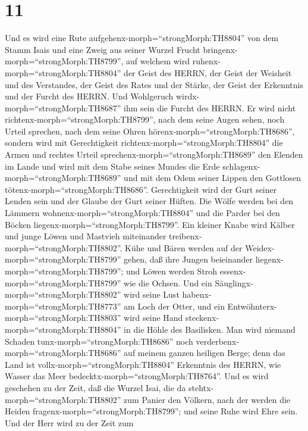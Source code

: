 \hypertarget{section-10}{%
\section{11}\label{section-10}}

 Und es wird eine Rute
aufgehenx-morph=``strongMorph:TH8804'' von dem Stamm Isais und eine
Zweig aus seiner Wurzel Frucht bringenx-morph=``strongMorph:TH8799'',
 auf welchem wird ruhenx-morph=``strongMorph:TH8804'' der
Geist des HERRN, der Geist der Weisheit und des Verstandes, der Geist
des Rates und der Stärke, der Geist der Erkenntnis und der Furcht des
HERRN.  Und Wohlgeruch wirdx-morph=``strongMorph:TH8687''
ihm sein die Furcht des HERRN. Er wird nicht
richtenx-morph=``strongMorph:TH8799'', nach dem seine Augen sehen, noch
Urteil sprechen, nach dem seine Ohren
hörenx-morph=``strongMorph:TH8686'',  sondern wird mit
Gerechtigkeit richtenx-morph=``strongMorph:TH8804'' die Armen und
rechtes Urteil sprechenx-morph=``strongMorph:TH8689'' den Elenden im
Lande und wird mit dem Stabe seines Mundes die Erde
schlagenx-morph=``strongMorph:TH8689'' und mit dem Odem seiner Lippen
den Gottlosen tötenx-morph=``strongMorph:TH8686''. 
Gerechtigkeit wird der Gurt seiner Lenden sein und der Glaube der Gurt
seiner Hüften.  Die Wölfe werden bei den Lämmern
wohnenx-morph=``strongMorph:TH8804'' und die Parder bei den Böcken
liegenx-morph=``strongMorph:TH8799''. Ein kleiner Knabe wird Kälber und
junge Löwen und Mastvieh miteinander
treibenx-morph=``strongMorph:TH8802''.  Kühe und Bären
werden auf der Weidex-morph=``strongMorph:TH8799'' gehen, daß ihre
Jungen beieinander liegenx-morph=``strongMorph:TH8799''; und Löwen
werden Stroh essenx-morph=``strongMorph:TH8799'' wie die Ochsen.
 Und ein Säuglingx-morph=``strongMorph:TH8802'' wird seine
Lust habenx-morph=``strongMorph:TH8773'' am Loch der Otter, und ein
Entwöhnterx-morph=``strongMorph:TH8803'' wird seine Hand
steckenx-morph=``strongMorph:TH8804'' in die Höhle des Basilisken.
 Man wird niemand Schaden tunx-morph=``strongMorph:TH8686''
noch verderbenx-morph=``strongMorph:TH8686'' auf meinem ganzen heiligen
Berge; denn das Land ist vollx-morph=``strongMorph:TH8804'' Erkenntnis
des HERRN, wie Wasser das Meer bedecktx-morph=``strongMorph:TH8764''.
 Und es wird geschehen zu der Zeit, daß die Wurzel Isai,
die da stehtx-morph=``strongMorph:TH8802'' zum Panier den Völkern, nach
der werden die Heiden fragenx-morph=``strongMorph:TH8799''; und seine
Ruhe wird Ehre sein.  Und der Herr wird zu der Zeit zum
